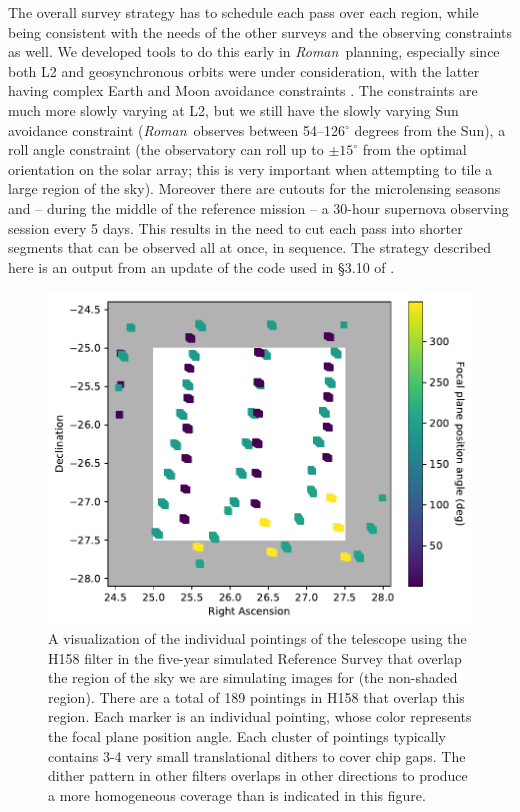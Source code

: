 \documentclass[usenatbib]{mnras}
\newcommand{\wfirst}{{\slshape Roman}}
\begin{document}
The overall survey strategy has to schedule each pass over each region, while being consistent with the needs of the other surveys and the observing constraints as well. We developed tools to do this early in \wfirst\ planning, especially since both L2 and geosynchronous orbits were under consideration, with the latter having complex Earth and Moon avoidance constraints \citep{2015arXiv150303757S}. The constraints are much more slowly varying at L2, but we still have the slowly varying Sun avoidance constraint (\wfirst\ observes between 54--126$^\circ$ degrees from the Sun), a roll angle constraint (the observatory can roll up to $\pm 15^\circ$ from the optimal orientation on the solar array; this is very important when attempting to tile a large region of the sky). Moreover there are cutouts for the microlensing seasons and -- during the middle of the reference mission -- a 30-hour supernova observing session every 5 days. This results in the need to cut each pass into shorter segments that can be observed all at once, in sequence. The strategy described here is an output from an update of the code used in \S3.10 of \cite{2015arXiv150303757S}.

\begin{figure}
\begin{center}
\includegraphics[width=\columnwidth]{figures/pointings.pdf}
\end{center}
\caption[]{
A visualization of the individual pointings of the telescope using the H158 filter in the five-year simulated Reference Survey that overlap the region of the sky we are simulating images for (the non-shaded region). There are a total of 189 pointings in H158 that overlap this region. Each marker is an individual pointing, whose color represents the focal plane position angle. Each cluster of pointings typically contains 3-4 very small translational dithers to cover chip gaps. The dither pattern in other filters overlaps in other directions to produce a more homogeneous coverage than is indicated in this figure. 
\label{fig:pointings}}
\end{figure}
\end{document}
